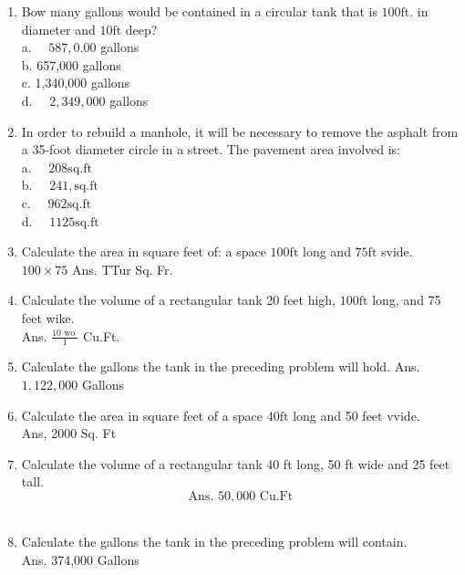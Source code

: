 \documentclass{article}
\begin{document}
\begin{enumerate}
\item Bow many gallons would be contained in a circular tank that is $100 \mathrm{ft}$. in diameter and $10 \mathrm{ft}$ deep?\\
a. $\quad 587,0.00$ gallons\\
b. 657,000 gallons\\
c. 1,340,000 gallons\\
d. $\quad 2,349,000$ gallons\\


\item In order to rebuild a manhole, it will be necessary to remove the asphalt from a 35-foot diameter circle in a street. The pavement area involved is:\\
a. $\quad 208 \mathrm{sq. ft}$\\
b. $\quad 241, \mathrm{sq. ft}$\\
c. $\quad 962 \mathrm{sq. ft}$\\
d. $\quad 1125 \mathrm{sq. ft}$\\

\item Calculate the area in square feet of: a space $100 \mathrm{ft}$ long and $75 \mathrm{ft}$ svide. $100 \times 75$ Ans. TTur Sq. Fr.\\

\item Calculate the volume of a rectangular tank 20 feet high, $100 \mathrm{ft}$ long, and 75 feet wike.\\
Ans. $\frac{10 \text { wo }}{1}$ Cu.Ft.\\

\item Calculate the gallons the tank in the preceding problem will hold. Ans. $1,122,000$ Gallons\\

\item Calculate the area in square feet of a space $40 \mathrm{ft}$ long and 50 feet vvide.\\
Ans, 2000 Sq. Ft\\

\item Calculate the volume of a rectangular tank 40 ft long, 50 ft wide and 25 feet tall.\\
$$\text { Ans. } 50,000 \text { Cu.Ft }$$\\

\item Calculate the gallons the tank in the preceding problem will contain.\\
Ans. 374,000 Gallons\\



\end{enumerate}
\end{document}
